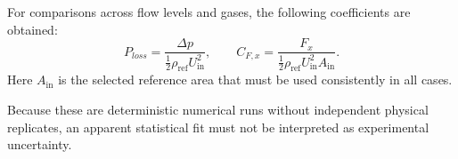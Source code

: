 For comparisons across flow levels and gases, the following coefficients are obtained:
\begin{equation}
    P_{loss}=\frac{\Delta p}{\tfrac12\rho_{\mathrm{ref}}U_{\mathrm{in}}^2},
    \qquad
    C_{F,x}=\frac{F_x}{\tfrac12\rho_{\mathrm{ref}}U_{\mathrm{in}}^2 A_{\mathrm{in}}}.
    \label{eq:response_coefficients}
\end{equation}
Here $A_{\mathrm{in}}$ is the selected reference area that must be used consistently in all cases.

Because these are deterministic numerical runs without independent physical replicates, an apparent statistical fit must not be interpreted as experimental uncertainty.